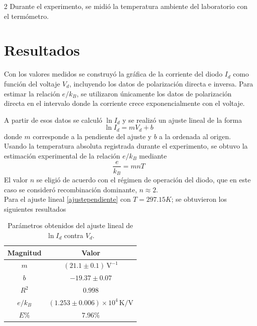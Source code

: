\documentclass[letterpaper, onecolumn, 12pt]{article} %
\begin{document}
\begin{multicols}{2}
\noindent Durante el experimento, se midió la temperatura ambiente del laboratorio con el termómetro.

\section{Resultados}

\noindent Con los valores medidos se construyó la gráfica de la corriente del diodo \(I_d\) como función del voltaje \(V_d\), incluyendo los datos de polarización directa e inversa. Para estimar la relación \(e/k_B\), se utilizaron únicamente los datos de polarización directa en el intervalo donde la corriente crece exponencialmente con el voltaje.

\noindent A partir de esos datos se calculó \(\ln I_d\) y se realizó un ajuste lineal de la forma
\begin{equation}
    \ln I_d = m V_d + b
    \label{ajustependiente}
\end{equation}
\noindent donde \(m\) corresponde a la pendiente del ajuste y \(b\) a la ordenada al origen. Usando la temperatura absoluta registrada durante el experimento, se obtuvo la estimación experimental de la relación \(e/k_B\) mediante
\begin{equation}
    \frac{e}{k_B} = m n T
\end{equation}
\noindent El valor $n$ se eligió de acuerdo con el régimen de operación del diodo, que en este caso se consideró recombinación dominante, \(n \approx 2\).\\

\noindent Para el ajuste lineal \ref{ajustependiente} con $T=297.15 K$; se obtuvieron los siguientes resultados

\begin{table}[H]
\centering
\caption{Parámetros obtenidos del ajuste lineal de \(\ln I_d\) contra \(V_d\).}
\begin{tabular}{cc}
\hline
Magnitud & Valor \\
\hline
\(m\) & \((21.1 \pm 0.1)\,\mathrm{V^{-1}}\) \\
\(b\) & \(-19.37 \pm 0.07\) \\
\(R^2\) & \(0.998\) \\
\(e/k_B\) & \((1.253 \pm 0.006)\times10^4\,\mathrm{K/V}\) \\
\(E\%\) & \(7.96\%\) \\
\hline
\end{tabular}
\end{table}


\end{multicols}
\end{document}
